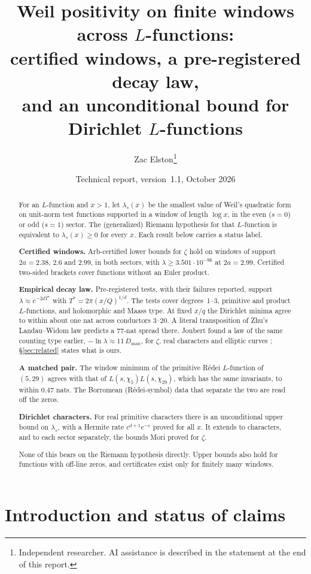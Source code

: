 \documentclass[11pt]{article}
\title{Weil positivity on finite windows across $L$-functions:\\
certified windows, a pre-registered decay law,\\
and an unconditional bound for Dirichlet $L$-functions}
\author{Zac Elston\thanks{Independent researcher. AI assistance is described in the statement at the end of this report.}}
\date{Technical report, version~1.1, October 2026}
\theoremstyle{remark}
\begin{document}
\maketitle

\begin{abstract}
For an $L$-function and $x>1$, let $\lambda_s(x)$ be the smallest value of Weil's quadratic form on unit-norm test functions supported in a window of length $\log x$, in the even ($s=0$) or odd ($s=1$) sector. The (generalized) Riemann hypothesis for that $L$-function is equivalent to $\lambda_s(x)\ge 0$ for every $x$. Each result below carries a status label.

\textbf{Certified windows.} Arb-certified lower bounds for $\zeta$ hold on windows of support $2a=2.38$, $2.6$ and $2.99$, in both sectors, with $\lambda\ge 3.501\cdot10^{-96}$ at $2a=2.99$. Certified two-sided brackets cover functions without an Euler product.

\textbf{Empirical decay law.} Pre-registered tests, with their failures reported, support $\lambda\approx e^{-2dT^*}$ with $T^*=2\pi(x/Q)^{1/d}$. The tests cover degrees~1--3, primitive and product $L$-functions, and holomorphic and Maass type. At fixed $x/q$ the Dirichlet minima agree to within about one nat across conductors $3$--$20$. A literal transposition of Zhu's Landau--Widom law predicts a $77$-nat spread there. Joubert found a law of the same counting type earlier, $-\ln\lambda\approx 11\,D_{\max}$, for $\zeta$, real characters and elliptic curves \cite{joubert26}; \S\ref{sec:related} states what is ours.

\textbf{A matched pair.} The window minimum of the primitive Rédei $L$-function of $(5,29)$ agrees with that of $L(s,\chi_5)L(s,\chi_{29})$, which has the same invariants, to within $0.47$ nats. The Borromean (Rédei-symbol) data that separate the two are read off the zeros.

\textbf{Dirichlet characters.} For real primitive characters there is an unconditional upper bound on $\lambda_s$, with a Hermite rate $c^{d+1}e^{-c}$ proved for all $x$. It extends to characters, and to each sector separately, the bounds Mori proved for $\zeta$.

None of this bears on the Riemann hypothesis directly. Upper bounds also hold for functions with off-line zeros, and certificates exist only for finitely many windows.
\end{abstract}

\section{Introduction and status of claims}
\end{document}
